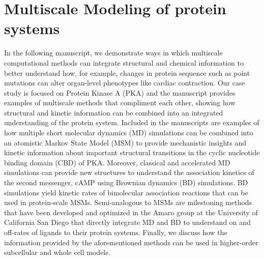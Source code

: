 \documentclass[12pt]{ucsddissertation}
\begin{document}





\chapter{Multiscale Modeling of protein systems}\label{first:chapter}
\vspace*{-1.2cm}
In the following manuscript, we demonstrate ways in which multiscale computational methods can integrate structural and chemical information to better understand how, for example, changes in protein sequence such as point mutations can alter organ-level phenotypes like cardiac contraction. Our case study is focused on Protein Kinase A (PKA) and the manuscript provides examples of multiscale methods that compliment each other, showing how structural and kinetic information can be combined into an integrated understanding of the protein system. Included in the manuscripts are examples of how multiple short molecular dynamics (MD) simulations can be combined into an atomistic Markov State Model (MSM) to provide mechanistic insights and kinetic information about important structural transitions in the cyclic nucleotide binding domain (CBD) of PKA. Moreover, classical and accelerated  MD simulations can provide new structures to understand the association kinetics of the second messenger, cAMP using Brownian dynamics (BD) simulations.  BD simulations yield kinetic rates of bimolecular association reactions that can be used in protein-scale MSMs. Semi-analogous to MSMs are milestoning methods that have been developed and optimized in the Amaro group at the University of California San Diego that directly integrate MD and BD to understand on and off-rates of ligands to their protein systems. Finally, we discuss how the information provided by the aforementioned methods can be used in higher-order subcellular and whole cell models. 
\end{document}
